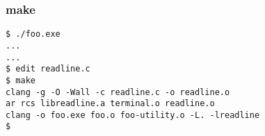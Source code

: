 \begin{frame}[fragile]\frametitle{make}
\begin{Verbatim}
$ ./foo.exe
...
...
$ edit readline.c
$ make
clang -g -O -Wall -c readline.c -o readline.o
ar rcs libreadline.a terminal.o readline.o
clang -o foo.exe foo.o foo-utility.o -L. -lreadline
$ 
\end{Verbatim}
\end{frame}
